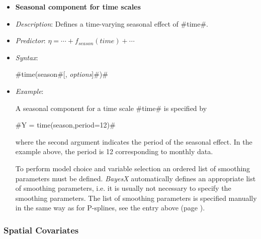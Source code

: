 \begin{itemize}
%
%
%
%
%
%


\item[]{\bf\sffamily Seasonal component for time scales}

\item[] {\em Description}: Defines a time-varying seasonal effect
of #time#. \item[] {\em Predictor}: $\eta =  \cdots +
f_{season}(time) + \cdots $ \item[] {\em Syntax}:

#time(season#[, {\em options}]#)#
\item[] {\em Example}:

A seasonal component for a time scale #time# is specified by

#Y = time(season,period=12)#

where the second argument indicates the period of the seasonal
effect. In the example above, the period is 12 corresponding to
monthly data.

To perform model choice and variable selection an ordered list of smoothing parameters must be defined. {\em BayesX} automatically defines an appropriate list of smoothing
parameters, i.e. it is usually not necessary to  specify the smoothing parameters. The list of smoothing parameters is
specified manually in the same way as for P-splines, see the entry above (page \pageref{psplines_stepwise}).
\end{itemize}

\subsubsection*{Spatial Covariates}

